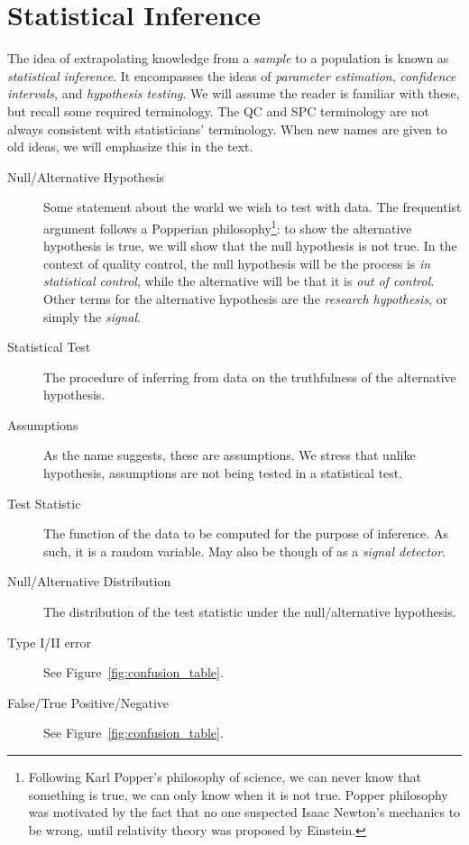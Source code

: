 \chapter{Statistical Inference} 
\label{sec:inference}

The idea of extrapolating knowledge from a \emph{sample} to a population is known as \emph{statistical inference}.
It encompasses the ideas of \emph{parameter estimation}, \emph{confidence intervals}, and \emph{hypothesis testing}.
We will assume the reader is familiar with these, but recall some required terminology.
The QC and SPC terminology are not always consistent with statisticians' terminology. When new names are given to old ideas, we will emphasize this in the text.

\begin{description}
\item [Null/Alternative Hypothesis] Some statement about the world we wish to test with data. The frequentist argument follows a Popperian philosophy\footnote{Following Karl Popper's philosophy of science, we can never know that something is true, we can only know when it is not true. Popper philosophy was motivated by the fact that no one suspected Isaac Newton's mechanics to be wrong, until relativity theory was proposed by Einstein.}: to show the alternative hypothesis is true, we will show that the null hypothesis is not true. 
In the context of quality control, the null hypothesis will be the process is \emph{in statistical control}, while the alternative will be that it is \emph{out of control}.
Other terms for the alternative hypothesis are the \emph{research hypothesis}, or simply the \emph{signal}.
\item [Statistical Test] The procedure of inferring from data on the truthfulness of the alternative hypothesis.
\item [Assumptions] As the name suggests, these are assumptions. We stress that unlike hypothesis, assumptions are not being tested in a statistical test. 
\item [Test Statistic] The function of the data to be computed for the purpose of inference. As such, it is a random variable. 
May also be though of as a \emph{signal detector}.
\item [Null/Alternative Distribution] The distribution of the test statistic under the null/alternative hypothesis.
\item [Type I/II error] See Figure~\ref{fig:confusion_table}.
\item [False/True Positive/Negative] See Figure~\ref{fig:confusion_table}.

\end{description}
